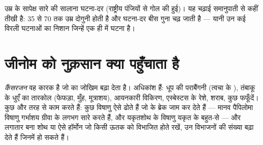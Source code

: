 \begin{omfigure}

{\small उम्र के सापेक्ष सारे  की सालाना घटना-दर (राष्ट्रीय पंजियों
से गोल की हुई)। यह चढ़ाई समानुपाती से कहीं तीखी है: 35 से 70 तक उम्र दोगुनी
होती है और घटना-दर बीस गुना चढ़ जाती है --- यानी उन कई विरली घटनाओं का
निशान जिन्हें एक ही  में घटना है।}
\end{omfigure}

\section{जीनोम को नुक़सान क्या पहुँचाता है}

\begin{definition}[कैंसरजन]\label{def:g11:cancer:carcinogen}
\emph{कैंसरजन} वह कारक है जो  का जोखिम बढ़ा देता है।
अधिकांश  हैं: धूप की पराबैंगनी (त्वचा के ), तंबाकू के
धुएँ का तारकोल (फेफड़ा, मुँह, मूत्राशय), आयनकारी विकिरण, एस्बेस्टस के
रेशे, शराब, कुछ फफूँदें। कुछ और तरह से काम करते हैं: कुछ विषाणु ऐसे 
ढोते हैं जो  के ब्रेक जाम कर देते हैं --- मानव पैपिलोमा विषाणु
गर्भाशय ग्रीवा के लगभग सारे  करते हैं, और यकृतशोथ के विषाणु यकृत के
बहुत-से  --- और लगातार बना शोथ या ऐसे हॉर्मोन जो किसी ऊतक को विभाजित
होते रखें, उन विभाजनों की संख्या बढ़ा देते हैं जिनमें  हो सकते
हैं।
\end{definition}

